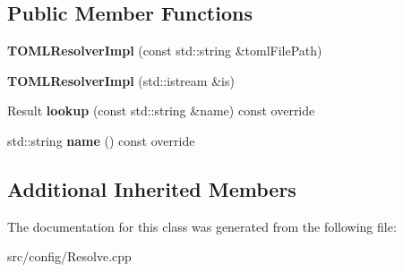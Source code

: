 \subsection*{Public Member Functions}
\begin{DoxyCompactItemize}
\item 
\hypertarget{classTOMLResolver_1_1TOMLResolverImpl_a297c93ec008519e79192844d483273ac}{{\bfseries T\+O\+M\+L\+Resolver\+Impl} (const std\+::string \&toml\+File\+Path)}\label{classTOMLResolver_1_1TOMLResolverImpl_a297c93ec008519e79192844d483273ac}

\item 
\hypertarget{classTOMLResolver_1_1TOMLResolverImpl_acee3fe2b048200875c6ee00aacad76ac}{{\bfseries T\+O\+M\+L\+Resolver\+Impl} (std\+::istream \&is)}\label{classTOMLResolver_1_1TOMLResolverImpl_acee3fe2b048200875c6ee00aacad76ac}

\item 
\hypertarget{classTOMLResolver_1_1TOMLResolverImpl_aebc6940c543f3b12484aa2735a6fcf1b}{Result {\bfseries lookup} (const std\+::string \&name) const override}\label{classTOMLResolver_1_1TOMLResolverImpl_aebc6940c543f3b12484aa2735a6fcf1b}

\item 
\hypertarget{classTOMLResolver_1_1TOMLResolverImpl_a5b9f36aca6c20a81b18b078fa74c3c14}{std\+::string {\bfseries name} () const override}\label{classTOMLResolver_1_1TOMLResolverImpl_a5b9f36aca6c20a81b18b078fa74c3c14}

\end{DoxyCompactItemize}
\subsection*{Additional Inherited Members}


The documentation for this class was generated from the following file\+:\begin{DoxyCompactItemize}
\item 
src/config/Resolve.\+cpp\end{DoxyCompactItemize}
